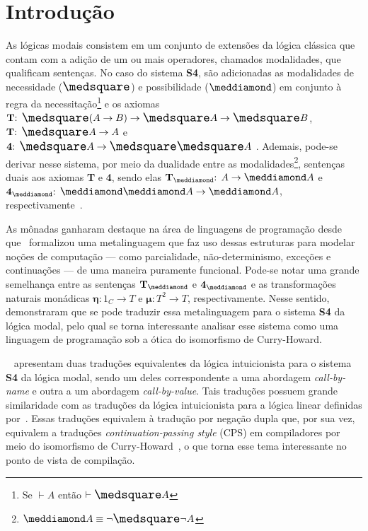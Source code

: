 \chapter{Introdução}

As lógicas modais consistem em um conjunto de extensões da lógica clássica que contam com a adição de um ou mais operadores, chamados modalidades, que qualificam sentenças. No caso do sistema \textbf{S4}, são adicionadas as modalidades de necessidade ($\nec$) e possibilidade ($\pos$) em conjunto à regra da necessitação\footnote{Se $\vdash A$ então $\vdash \nec A$} e os axiomas $\mathbf{T}\text{: } \nec(A \to B) \to \nec A \to \nec B$, $\mathbf{T}\text{: } \nec A \to A$ e $\text{\textbf{4}: } \nec A \to \nec \nec A$ \citep{Troelstra}. Ademais, pode-se derivar nesse sistema, por meio da dualidade entre as modalidades\footnote{$\pos A \equiv \neg \nec \neg A $}, sentenças duais aos axiomas \textbf{T} e \textbf{4}, sendo elas $\mathbf{T}_\meddiamond \text{: } A \to \pos A$ e $\mathbf{4}_\meddiamond \text{: } \pos \pos A \to \pos A$, respectivamente~\cite{Zach}.

As mônadas ganharam destaque na área de linguagens de programação desde que~\cite{Moggi} formalizou uma metalinguagem que faz uso dessas estruturas para modelar noções de computação --- como parcialidade, não-determinismo, exceções e continuações --- de uma maneira puramente funcional. Pode-se notar uma grande semelhança entre as sentenças $\mathbf{T}_\meddiamond$ e $\mathbf{4}_\meddiamond$ e as transformações naturais monádicas $\mathbf{\eta:} 1_C \to T$ e $\mathbf{\mu:} T^2 \to T$, respectivamente. Nesse sentido,~\cite{Pfenning} demonstraram que se pode traduzir essa metalinguagem para o sistema \textbf{S4} da lógica modal, pelo qual se torna interessante analisar esse sistema como uma linguagem de programação sob a ótica do isomorfismo de Curry-Howard.

~\cite{Troelstra} apresentam duas traduções equivalentes da lógica intuicionista para o sistema \textbf{S4} da lógica modal, sendo um deles correspondente a uma abordagem \textit{call-by-name} e outra a um abordagem \textit{call-by-value}. Tais traduções possuem grande similaridade com as traduções da lógica intuicionista para a lógica linear definidas por~\cite{Girard}. Essas traduções equivalem à tradução por negação dupla que, por sua vez, equivalem a traduções \textit{continuation-passing style} (CPS) em compiladores por meio do isomorfismo de Curry-Howard~\citep{Reynolds}, o que torna esse tema interessante no ponto de vista de compilação.

